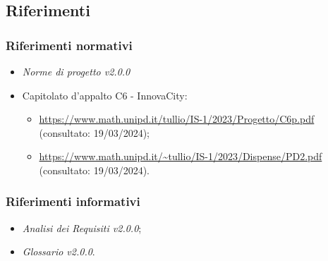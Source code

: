 \subsection{Riferimenti}

\subsubsection{Riferimenti normativi}
\begin{itemize}
    \item \textit{Norme di progetto v2.0.0}
    \item Capitolato d'appalto C6 - InnovaCity:
        \begin{itemize}
            \item \url{https://www.math.unipd.it/tullio/IS-1/2023/Progetto/C6p.pdf} (consultato: 19/03/2024);
            \item \url{https://www.math.unipd.it/~tullio/IS-1/2023/Dispense/PD2.pdf} (consultato: 19/03/2024).
        \end{itemize}
\end{itemize}


\subsubsection{Riferimenti informativi}
\begin{itemize}
    \item \textit{Analisi dei Requisiti v2.0.0};
    \item \textit{Glossario v2.0.0}.
\end{itemize}